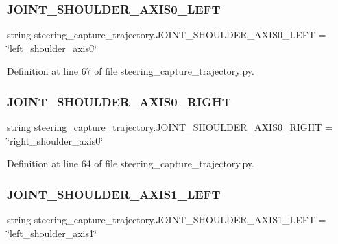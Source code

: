 \subsubsection{\texorpdfstring{JOINT\_SHOULDER\_AXIS0\_LEFT}{JOINT\_SHOULDER\_AXIS0\_LEFT}}
{\footnotesize\ttfamily string steering\+\_\+capture\+\_\+trajectory.\+J\+O\+I\+N\+T\+\_\+\+S\+H\+O\+U\+L\+D\+E\+R\+\_\+\+A\+X\+I\+S0\+\_\+\+L\+E\+FT = \char`\"{}left\+\_\+shoulder\+\_\+axis0\char`\"{}}



Definition at line 67 of file steering\+\_\+capture\+\_\+trajectory.\+py.

\mbox{\label{namespacesteering__capture__trajectory_abe1b65eead7e08263756bbd4cb8a707d}} 
\subsubsection{\texorpdfstring{JOINT\_SHOULDER\_AXIS0\_RIGHT}{JOINT\_SHOULDER\_AXIS0\_RIGHT}}
{\footnotesize\ttfamily string steering\+\_\+capture\+\_\+trajectory.\+J\+O\+I\+N\+T\+\_\+\+S\+H\+O\+U\+L\+D\+E\+R\+\_\+\+A\+X\+I\+S0\+\_\+\+R\+I\+G\+HT = \char`\"{}right\+\_\+shoulder\+\_\+axis0\char`\"{}}



Definition at line 64 of file steering\+\_\+capture\+\_\+trajectory.\+py.

\mbox{\label{namespacesteering__capture__trajectory_a54818ddd4d017c6522d3e96954fb159d}} 
\subsubsection{\texorpdfstring{JOINT\_SHOULDER\_AXIS1\_LEFT}{JOINT\_SHOULDER\_AXIS1\_LEFT}}
{\footnotesize\ttfamily string steering\+\_\+capture\+\_\+trajectory.\+J\+O\+I\+N\+T\+\_\+\+S\+H\+O\+U\+L\+D\+E\+R\+\_\+\+A\+X\+I\+S1\+\_\+\+L\+E\+FT = \char`\"{}left\+\_\+shoulder\+\_\+axis1\char`\"{}}



